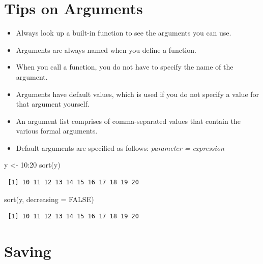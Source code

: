 \documentclass[
  letterpaper,
  DIV=11,
  numbers=noendperiod]{scrreprt}
\newenvironment{Shaded}{\begin{snugshade}}{\end{snugshade}}
\newcommand{\AttributeTok}[1]{\textcolor[rgb]{0.40,0.45,0.13}{#1}}
\newcommand{\ConstantTok}[1]{\textcolor[rgb]{0.56,0.35,0.01}{#1}}
\newcommand{\DecValTok}[1]{\textcolor[rgb]{0.68,0.00,0.00}{#1}}
\newcommand{\FunctionTok}[1]{\textcolor[rgb]{0.28,0.35,0.67}{#1}}
\newcommand{\NormalTok}[1]{\textcolor[rgb]{0.00,0.23,0.31}{#1}}
\newcommand{\OtherTok}[1]{\textcolor[rgb]{0.00,0.23,0.31}{#1}}
\newcommand{\SpecialCharTok}[1]{\textcolor[rgb]{0.37,0.37,0.37}{#1}}
\providecommand{\tightlist}{%
  \setlength{\itemsep}{0pt}\setlength{\parskip}{0pt}}\usepackage{longtable,booktabs,array}
\begin{document}
\section{Tips on Arguments}\label{tips-on-arguments}

\begin{itemize}
\tightlist
\item
  Always look up a built-in function to see the arguments you can use.
\item
  Arguments are always named when you define a function.
\item
  When you call a function, you do not have to specify the name of the
  argument.
\item
  Arguments have default values, which is used if you do not specify a
  value for that argument yourself.
\item
  An argument list comprises of comma-separated values that contain the
  various formal arguments.
\item
  Default arguments are specified as follows: \emph{parameter =
  expression}
\end{itemize}

\begin{Shaded}
\begin{Highlighting}[]
\NormalTok{y }\OtherTok{\textless{}{-}} \DecValTok{10}\SpecialCharTok{:}\DecValTok{20}
\FunctionTok{sort}\NormalTok{(y)}
\end{Highlighting}
\end{Shaded}

\begin{verbatim}
 [1] 10 11 12 13 14 15 16 17 18 19 20
\end{verbatim}

\begin{Shaded}
\begin{Highlighting}[]
\FunctionTok{sort}\NormalTok{(y, }\AttributeTok{decreasing =} \ConstantTok{FALSE}\NormalTok{)}
\end{Highlighting}
\end{Shaded}

\begin{verbatim}
 [1] 10 11 12 13 14 15 16 17 18 19 20
\end{verbatim}

\section{Saving}\label{saving}
\end{document}
